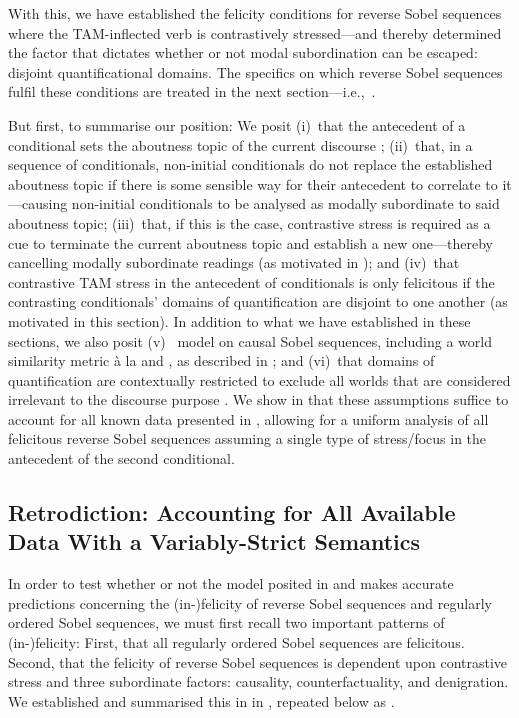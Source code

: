 With this, we have established the felicity conditions for reverse Sobel sequences where the TAM-inflected verb is contrastively stressed---and thereby determined the factor that dictates whether or not modal subordination can be escaped: disjoint quantificational domains. The specifics on which reverse Sobel sequences fulfil these conditions are treated in the next section---i.e.,~.




But first, to summarise our position: We posit (i)~that the antecedent of a conditional sets the aboutness topic of the current discourse \parencite{Ebert2008,Ebert2014}; (ii)~that, in a sequence of conditionals, non-initial conditionals do not replace the established aboutness topic if there is some sensible way for their antecedent to correlate to it---causing non-initial conditionals to be analysed as modally subordinate to said aboutness topic; (iii)~that, if this is the case, contrastive stress is required as a cue to terminate the current aboutness topic and establish a new one---thereby cancelling modally subordinate readings (as motivated in ); and (iv)~that contrastive TAM stress in the antecedent of conditionals is only felicitous if the contrasting conditionals' domains of quantification are disjoint to one another (as motivated in this section). In addition to what we have established in these sections, we also posit (v)~ model on causal Sobel sequences, including a world similarity metric \`a la \textcite{Bennett2003} and \textcite{Arregui2009}, as described in ; and (vi)~that domains of quantification are contextually restricted to exclude all worlds that are considered irrelevant to the discourse purpose \parencites{Fintel1994}{Reimer1998}{Stanley2000}{Klecha2014}[amongst many others]{Klecha2015}. We show in  that these assumptions suffice to account for all known data presented in , allowing for a uniform analysis of all felicitous reverse Sobel sequences assuming a single type of stress/focus in the antecedent of the second conditional.

\subsection{Retrodiction: Accounting for All Available Data With a Variably-Strict Semantics}
In order to test whether or not the model posited in  and  makes accurate predictions concerning the (in-)felicity of reverse Sobel sequences and regularly ordered Sobel sequences, we must first recall two important patterns of (in-)felicity: First, that all regularly ordered Sobel sequences are felicitous. Second, that the felicity of reverse Sobel sequences is dependent upon contrastive stress and three subordinate factors: causality, counterfactuality, and denigration. We established and summarised this in  in , repeated below as .

